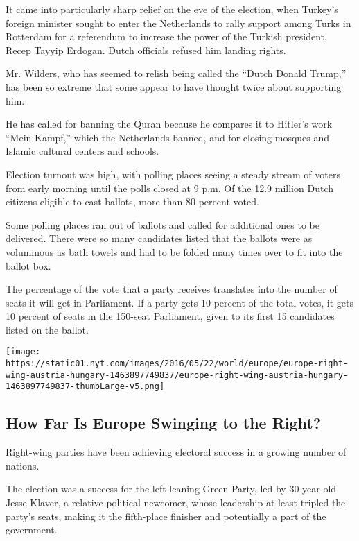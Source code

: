 It came into particularly sharp relief on the eve of the election, when
Turkey's foreign minister sought to enter the Netherlands to rally
support among Turks in Rotterdam for a referendum to increase the power
of the Turkish president, Recep Tayyip Erdogan. Dutch officials refused
him landing rights.

Mr. Wilders, who has seemed to relish being called the ``Dutch Donald
Trump,'' has been so extreme that some appear to have thought twice
about supporting him.

He has called for banning the Quran because he compares it to Hitler's
work ``Mein Kampf,'' which the Netherlands banned, and for closing
mosques and Islamic cultural centers and schools.

Election turnout was high, with polling places seeing a steady stream of
voters from early morning until the polls closed at 9 p.m. Of the 12.9
million Dutch citizens eligible to cast ballots, more than 80 percent
voted.

Some polling places ran out of ballots and called for additional ones to
be delivered. There were so many candidates listed that the ballots were
as voluminous as bath towels and had to be folded many times over to fit
into the ballot box.

The percentage of the vote that a party receives translates into the
number of seats it will get in Parliament. If a party gets 10 percent of
the total votes, it gets 10 percent of seats in the 150-seat Parliament,
given to its first 15 candidates listed on the ballot.

\href{https://www.nytimes.com/interactive/2016/05/22/world/europe/europe-right-wing-austria-hungary.html}{}

\texttt{[image: https://static01.nyt.com/images/2016/05/22/world/europe/europe-right-wing-austria-hungary-1463897749837/europe-right-wing-austria-hungary-1463897749837-thumbLarge-v5.png]}

\hypertarget{how-far-is-europe-swinging-to-the-right-1}{%
\subsection{How Far Is Europe Swinging to the
Right?}\label{how-far-is-europe-swinging-to-the-right-1}}

Right-wing parties have been achieving electoral success in a growing
number of nations.

The election was a success for the left-leaning Green Party, led by
30-year-old Jesse Klaver, a relative political newcomer, whose
leadership at least tripled the party's seats, making it the fifth-place
finisher and potentially a part of the government.

